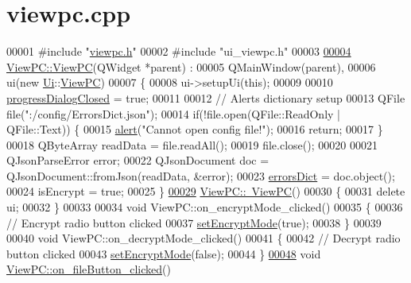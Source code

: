 \hypertarget{viewpc_8cpp_source}{}\section{viewpc.\+cpp}

\begin{DoxyCode}
00001 \textcolor{preprocessor}{#include "\hyperlink{viewpc_8h}{viewpc.h}"}
00002 \textcolor{preprocessor}{#include "ui\_viewpc.h"}
00003 
\hypertarget{viewpc_8cpp_source.tex_l00004}{}\hyperlink{class_view_p_c_a33c96c61f61042319c66c19059836b7f}{00004} \hyperlink{class_view_p_c_a33c96c61f61042319c66c19059836b7f}{ViewPC::ViewPC}(QWidget *parent) :
00005     QMainWindow(parent),
00006     ui(new \hyperlink{namespace_ui}{Ui}::\hyperlink{class_view_p_c}{ViewPC})
00007 \{
00008     ui->setupUi(\textcolor{keyword}{this});
00009 
00010     \hyperlink{class_view_p_c_add8c82aa2b0b934212aa5bde9277ab36}{progressDialogClosed} = \textcolor{keyword}{true};
00011 
00012     \textcolor{comment}{// Alerts dictionary setup}
00013     QFile file(\textcolor{stringliteral}{":/config/ErrorsDict.json"});
00014     \textcolor{keywordflow}{if}(!file.open(QFile::ReadOnly | QFile::Text)) \{
00015         \hyperlink{class_view_p_c_a7c467169467789561078abc9d4fe57bd}{alert}(\textcolor{stringliteral}{"Cannot open config file!"});
00016         \textcolor{keywordflow}{return};
00017     \}
00018     QByteArray readData = file.readAll();
00019     file.close();
00020 
00021     QJsonParseError error;
00022     QJsonDocument doc = QJsonDocument::fromJson(readData, &error);
00023     \hyperlink{class_view_p_c_a26f90436aca32e5bad46f5e69a7e7e09}{errorsDict} = doc.object();
00024     isEncrypt = \textcolor{keyword}{true};
00025 \}
\hypertarget{viewpc_8cpp_source.tex_l00029}{}\hyperlink{class_view_p_c_a91c51f5c1e6ed5ab12b410339f469b0f}{00029} \hyperlink{class_view_p_c_a91c51f5c1e6ed5ab12b410339f469b0f}{ViewPC::~ViewPC}()
00030 \{
00031     \textcolor{keyword}{delete} ui;
00032 \}
00033 
00034 \textcolor{keywordtype}{void} ViewPC::on\_encryptMode\_clicked()
00035 \{
00036     \textcolor{comment}{// Encrypt radio button clicked}
00037     \hyperlink{class_view_p_c_a5b48951efefdc0e3039c9a4bf185320b}{setEncryptMode}(\textcolor{keyword}{true});
00038 \}
00039 
00040 \textcolor{keywordtype}{void} ViewPC::on\_decryptMode\_clicked()
00041 \{
00042     \textcolor{comment}{// Decrypt radio button clicked}
00043     \hyperlink{class_view_p_c_a5b48951efefdc0e3039c9a4bf185320b}{setEncryptMode}(\textcolor{keyword}{false});
00044 \}
\hypertarget{viewpc_8cpp_source.tex_l00048}{}\hyperlink{class_view_p_c_a3b9b7a7be9702d8b160f257f1c74a776}{00048} \textcolor{keywordtype}{void} \hyperlink{class_view_p_c_a3b9b7a7be9702d8b160f257f1c74a776}{ViewPC::on\_fileButton\_clicked}()

\end{DoxyCode}

